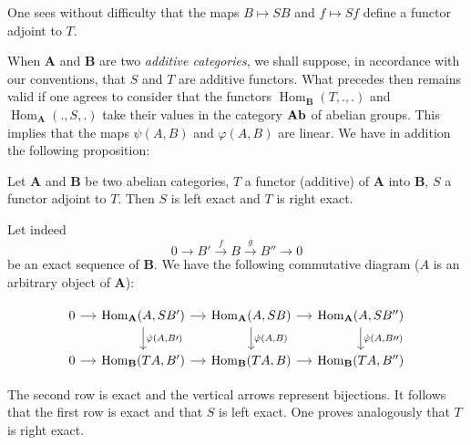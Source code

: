One sees without difficulty that the maps $B\mapsto SB$ and $f\mapsto Sf$
define a functor adjoint to $T$.

When $\mathbf{A}$ and $\mathbf{B}$ are two \emph{additive categories}, we
shall suppose, in accordance with our conventions, that $S$ and $T$ are
additive functors. What precedes then remains valid if one agrees to
consider that the functors $\operatorname{Hom}_{\mathbf{B}}(T,.,.)$ and
$\operatorname{Hom}_{\mathbf{A}}(.,S,.)$ take their values in the category
$\mathbf{Ab}$ of abelian groups. This implies that the maps $\psi(A,B)$ and
$\varphi(A,B)$ are linear. We have in addition the following proposition:

\begin{proposition}\label{prop:adjoints-exactness}
Let $\mathbf{A}$ and $\mathbf{B}$ be two abelian categories, $T$ a functor
(additive) of $\mathbf{A}$ into $\mathbf{B}$, $S$ a functor adjoint to
$T$. Then $S$ is left exact and $T$ is right exact.
\end{proposition}

Let indeed
\[
  0\longrightarrow B'\xrightarrow{f}B\xrightarrow{g}B''\longrightarrow 0
\]
be an exact sequence of $\mathbf{B}$. We have the following commutative
diagram ($A$ is an arbitrary object of $\mathbf{A}$):

\[
\begin{tikzcd}[column sep=small]
0 \arrow[r] &
\operatorname{Hom}_{\mathbf{A}}(A,SB')
  \arrow[r] \arrow[d, "\natt{\varphi}(A{,}B\prime)"] &
\operatorname{Hom}_{\mathbf{A}}(A,SB)
  \arrow[r] \arrow[d, "\natt{\varphi}(A{,}B)"] &
\operatorname{Hom}_{\mathbf{A}}(A,SB'')
  \arrow[d, "\natt{\varphi}(A{,}B\prime\prime)"] \\
0 \arrow[r] &
\operatorname{Hom}_{\mathbf{B}}(TA,B') \arrow[r] &
\operatorname{Hom}_{\mathbf{B}}(TA,B) \arrow[r] &
\operatorname{Hom}_{\mathbf{B}}(TA,B'') 
\end{tikzcd}
\]

The second row is exact and the vertical arrows represent bijections. It
follows that the first row is exact and that $S$ is left exact. One
proves analogously that $T$ is right exact.
